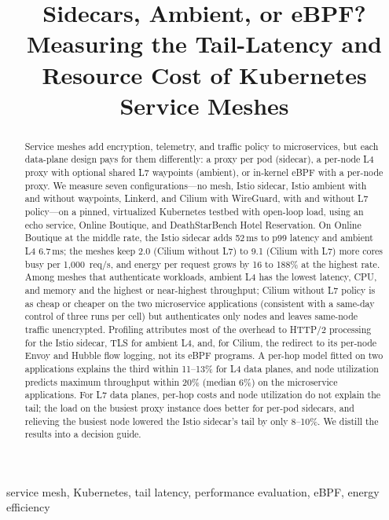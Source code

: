\documentclass[conference]{IEEEtran}
\begin{document}
\title{Sidecars, Ambient, or eBPF? Measuring the Tail-Latency and Resource Cost of Kubernetes Service Meshes}

\author{
}

\maketitle

\begin{abstract}
Service meshes add encryption, telemetry, and traffic policy to microservices, but each data-plane design pays for
them differently: a proxy per pod (sidecar), a per-node L4 proxy with optional shared L7 waypoints (ambient), or
in-kernel eBPF with a per-node proxy. We measure seven configurations---no mesh, Istio sidecar, Istio ambient with and
without waypoints, Linkerd, and Cilium with WireGuard, with and without L7 policy---on a pinned, virtualized
Kubernetes testbed with open-loop load, using an echo service, Online Boutique, and DeathStarBench Hotel
Reservation. On Online Boutique at the middle rate, the Istio sidecar adds 52\,ms to p99 latency and ambient L4
6.7\,ms; the meshes keep 2.0 (Cilium without L7) to 9.1 (Cilium with L7) more cores busy per 1{,}000~req/s,
and energy per request grows by 16 to 188\% at the highest rate. Among meshes that authenticate workloads,
ambient L4 has the lowest latency, CPU, and memory and the highest or near-highest throughput; Cilium without
L7 policy is as cheap or cheaper on the two microservice applications (consistent with a same-day control of
three runs per cell) but authenticates only nodes and leaves same-node traffic unencrypted. Profiling attributes most of the overhead to HTTP/2 processing for the Istio sidecar,
TLS for ambient L4, and, for Cilium, the redirect to its per-node Envoy and Hubble flow logging, not its eBPF
programs. A per-hop model fitted on two applications explains the third within 11--13\% for L4 data planes, and
node utilization predicts maximum throughput within 20\% (median 6\%) on the microservice applications. For L7 data planes, per-hop
costs and node utilization do not explain the tail; the load on the busiest proxy instance does better for
per-pod sidecars, and relieving the busiest node lowered the Istio sidecar's tail by only 8--10\%. We distill the results
into a decision guide.
\end{abstract}

\begin{IEEEkeywords}
service mesh, Kubernetes, tail latency, performance evaluation, eBPF, energy efficiency
\end{IEEEkeywords}
\end{document}
